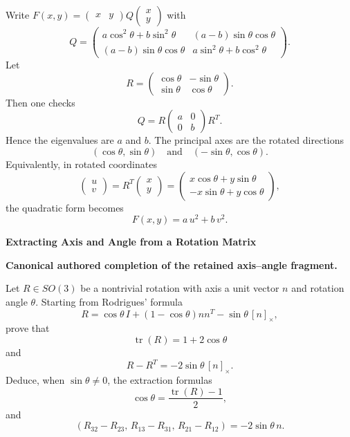 \begin{solution}
Write $F(x,y)=\begin{pmatrix}x&y\end{pmatrix}Q\begin{pmatrix}x\\y\end{pmatrix}$ with
\[
Q=
\begin{pmatrix}
	a\cos^2\theta+b\sin^2\theta & (a-b)\sin\theta\cos\theta\\
	(a-b)\sin\theta\cos\theta & a\sin^2\theta+b\cos^2\theta
\end{pmatrix}.
\]
Let
\[
R=
\begin{pmatrix}
	\cos\theta&-\sin\theta\\
	\sin\theta&\cos\theta
\end{pmatrix}.
\]
Then one checks
\[
Q=R\begin{pmatrix}a&0\\0&b\end{pmatrix}R^T.
\]
Hence the eigenvalues are $a$ and $b$. The principal axes are the rotated directions
\[
(\cos\theta,\sin\theta)\quad\text{and}\quad(-\sin\theta,\cos\theta).
\]
Equivalently, in rotated coordinates
\[
\begin{pmatrix}u\\v\end{pmatrix}=R^T\begin{pmatrix}x\\y\end{pmatrix}
=
\begin{pmatrix}
	x\cos\theta+y\sin\theta\\
	-x\sin\theta+y\cos\theta
\end{pmatrix},
\]
the quadratic form becomes
\[
F(x,y)=a\,u^2+b\,v^2.
\]
\end{solution}

\begin{problem}[CP-I-0102]
\label{prob:cp-i-0102}
\textbf{Extracting Axis and Angle from a Rotation Matrix}

\textbf{Canonical authored completion of the retained axis--angle fragment.}

\hspace*{1.5em}Let \(R\in SO(3)\) be a nontrivial rotation with axis a unit vector \(n\) and
rotation angle \(\theta\). Starting from Rodrigues' formula
\[
R=\cos\theta\,I+(1-\cos\theta)nn^T-\sin\theta\,[n]_\times,
\]
prove that
\[
\operatorname{tr}(R)=1+2\cos\theta
\]
and
\[
R-R^T=-2\sin\theta\,[n]_\times.
\]
Deduce, when \(\sin\theta\neq0\), the extraction formulas
\[
\cos\theta=\frac{\operatorname{tr}(R)-1}{2},
\]
and
\[
(R_{32}-R_{23},\,R_{13}-R_{31},\,R_{21}-R_{12})
=
-2\sin\theta\,n.
\]
\end{problem}

